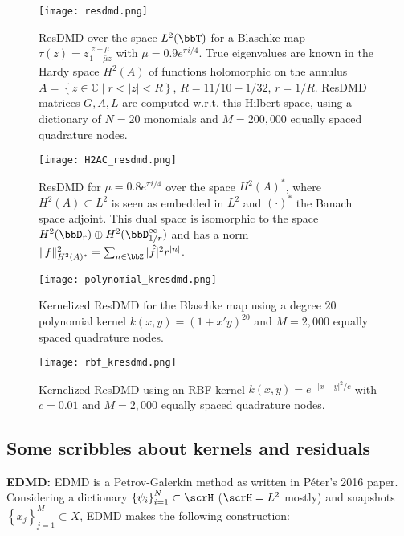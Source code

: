 \begin{figure}
    \texttt{[image: resdmd.png]}
    \caption{
        ResDMD over the space $L^2(\bbT)$ for a Blaschke map 
        $\tau (z) = z \frac{z - \mu}{1 - \bar{\mu} z}$ with $\mu = 0.9 e^{\pi i / 4}$. 
        True eigenvalues are known in the Hardy space $H^2 (A)$ of functions holomorphic on 
        the annulus 
        $A = \left\{ z \in \mathbb{C} \mid r < |z| < R \right\}$, 
        $R = 11/10 - 1/32$, $r = 1/R$. ResDMD matrices $G, A, L$ are computed w.r.t. this   
        Hilbert space, using a dictionary of $N = 20$ monomials and $M = 200,000$
        equally spaced quadrature nodes. 
    }
    \label{fig:resdmd}
\end{figure}

\begin{figure}
    \texttt{[image: H2AC\_resdmd.png]}
    \caption{
        ResDMD for $\mu = 0.8 e^{\pi i / 4}$ over the space $H^2 (A)^*$, where 
        $H^2 (A) \subset L^2$ is seen as embedded in $L^2$ and $(\cdot)^*$ the Banach space 
        adjoint. This dual space is isomorphic to the space 
        $H^2 (\bbD_r) \oplus H^2 (\bbD_{1/r}^\infty)$ and has a norm 
        $\| f \|_{H^2 (A)^*}^2 = \sum_{n \in \bbZ} | \hat{f} |^2 r^{| n |}$. 
    }
\end{figure}

\begin{figure}
    \texttt{[image: polynomial\_kresdmd.png]}
    \caption{
        Kernelized ResDMD for the Blaschke map using a degree $20$ polynomial kernel 
        $k(x,y) = (1 + x'y)^{20}$ 
        and $M = 2,000$ equally spaced quadrature nodes. 
    }
    \label{fig:poly}
\end{figure}

\begin{figure}
    \texttt{[image: rbf\_kresdmd.png]}
    \caption{
        Kernelized ResDMD using an RBF kernel $k(x,y) = e^{- |x - y|^2 / c}$ with 
        $c = 0.01$ and $M = 2,000$ equally spaced quadrature nodes. 
    }
    \label{fig:gauss}
\end{figure}


\subsection{Some scribbles about kernels and residuals}

\textbf{EDMD:} EDMD is a Petrov-Galerkin method as written in Péter's 2016 paper. 
Considering a dictionary $\left\{ \psi_i \right\}_{i=1}^N \subset \scrH$ ($\scrH = L^2$ 
mostly) and snapshots $\left\{ x_j \right\}_{j=1}^M \subset X$, EDMD makes the following 
construction:

